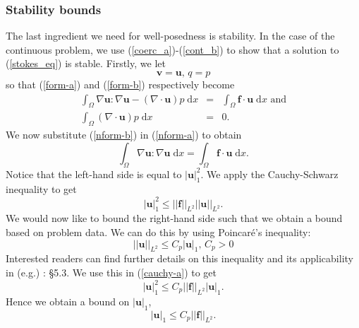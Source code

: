 \documentclass[12pt,a4paper]{article}
\theoremstyle{definition}
\begin{document}
\subsubsection{Stability bounds}\label{sec_stability_bounds}
The last ingredient we need for well-posedness is stability.  In the case of the continuous problem, we use (\ref{coerc_a})-(\ref{cont_b}) to show that a solution to (\ref{stokes_eq}) is stable. Firstly, we let 
\begin{equation}
	\textbf{v}=\textbf{u},\, q =p
\end{equation}
so that (\ref{form-a}) and (\ref{form-b}) respectively become
\begin{eqnarray}\label{nform-a}
\int_{\Omega}\nabla \textbf{u} : \nabla \textbf{u}-\left(\nabla \cdot \textbf{u}\right)p\;\mathrm{d}x  &=&\int_{\Omega}\textbf{f}\cdot \textbf{u} \;\mathrm{d}x
 \text{ and} \\\label{nform-b}
\int_{\Omega}\left(\nabla \cdot \textbf{u}\right)p\;\mathrm{d}x&=& 0.
\end{eqnarray}
We now substitute (\ref{nform-b}) in (\ref{nform-a}) to obtain
\begin{equation}
\int_{\Omega}\nabla \textbf{u} : \nabla \textbf{u}\;\mathrm{d}x  =\int_{\Omega}\textbf{f}\cdot \textbf{u} \;\mathrm{d}x.
\end{equation}
Notice that the left-hand side is equal to $\left|\textbf{u}\right|_1^2$.  We apply the Cauchy-Schwarz inequality to get
\begin{equation}\label{cauchy-a}
\left|\textbf{u}\right|_1^2\leq\left|\left|\textbf{f}\right|\right|_{L^2}\left|\left|\textbf{u}\right|\right|_{L^2}.
\end{equation}
We would now like to bound the right-hand side such that we obtain a bound based on problem data.  We can do this by using Poincar\'e's inequality:
\begin{equation} 
\left|\left|\textbf{u}\right|\right|_{L^2}\leq C_p\left|\textbf{u}\right|_1\text{, } C_p>0
\end{equation}
Interested readers can find further details on this inequality and its applicability  in (e.g.) \cite{brenner2007mathematical}: \S 5.3.  We use this in (\ref{cauchy-a}) to get
\begin{equation}\label{cauchy-b}
\left|\textbf{u}\right|_1^2\leq C_p\left|\left|\textbf{f}\right|\right|_{L^2} \left|\textbf{u}\right|_1.
\end{equation}
Hence we obtain a bound on $\left|\textbf{u}\right|_1$, 
\begin{equation}\label{bound-u-cont}
\left|\textbf{u}\right|_1\leq C_p\left|\left|\textbf{f}\right|\right|_{L^2}.
\end{equation}
\end{document}
